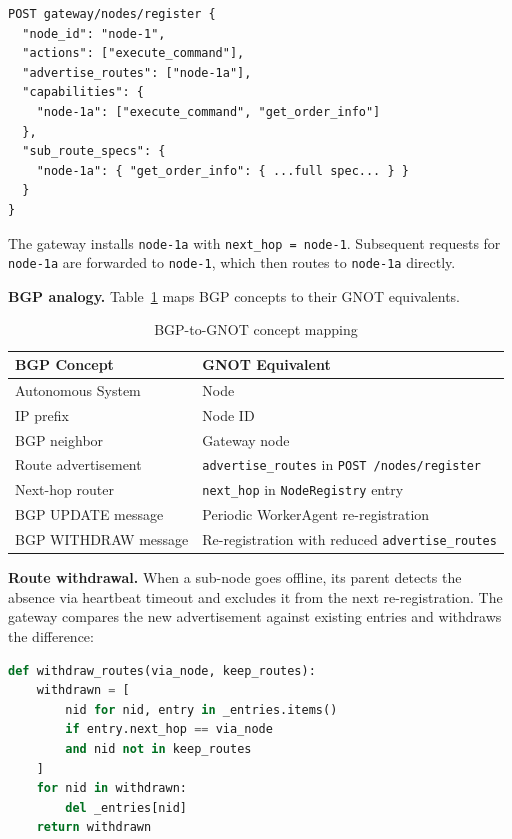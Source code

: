 \documentclass[10pt,twocolumn]{article}
\begin{document}
\begin{lstlisting}[caption={Re-registration with route advertisement}]
POST gateway/nodes/register {
  "node_id": "node-1",
  "actions": ["execute_command"],
  "advertise_routes": ["node-1a"],
  "capabilities": {
    "node-1a": ["execute_command", "get_order_info"]
  },
  "sub_route_specs": {
    "node-1a": { "get_order_info": { ...full spec... } }
  }
}
\end{lstlisting}

The gateway installs \texttt{node-1a} with \texttt{next\_hop = node-1}.
Subsequent requests for \texttt{node-1a} are forwarded to \texttt{node-1},
which then routes to \texttt{node-1a} directly.

\textbf{BGP analogy.} Table~\ref{tab:bgp} maps BGP concepts to their
GNOT equivalents.

\begin{table}[tp]
\centering
\caption{BGP-to-GNOT concept mapping}
\label{tab:bgp}
\small
\begin{tabular}{@{}ll@{}}
\toprule
\textbf{BGP Concept} & \textbf{GNOT Equivalent} \\
\midrule
Autonomous System & Node \\
IP prefix & Node ID \\
BGP neighbor & Gateway node \\
Route advertisement & \texttt{advertise\_routes} in \texttt{POST /nodes/register} \\
Next-hop router & \texttt{next\_hop} in \texttt{NodeRegistry} entry \\
BGP UPDATE message & Periodic WorkerAgent re-registration \\
BGP WITHDRAW message & Re-registration with reduced \texttt{advertise\_routes} \\
\bottomrule
\end{tabular}
\end{table}

\textbf{Route withdrawal.} When a sub-node goes offline, its parent
detects the absence via heartbeat timeout and excludes it from the next
re-registration. The gateway compares the new advertisement against
existing entries and withdraws the difference:

\begin{lstlisting}[language=python, caption={Route withdrawal logic}]
def withdraw_routes(via_node, keep_routes):
    withdrawn = [
        nid for nid, entry in _entries.items()
        if entry.next_hop == via_node
        and nid not in keep_routes
    ]
    for nid in withdrawn:
        del _entries[nid]
    return withdrawn
\end{lstlisting}
\end{document}
